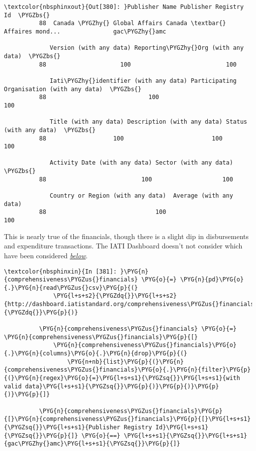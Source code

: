 \documentclass[letterpaper,10pt,english]{sphinxmanual}
\begin{document}
\begin{Verbatim}[commandchars=\\\{\}]
\textcolor{nbsphinxout}{Out[380]: }Publisher Name Publisher Registry Id  \PYGZbs{}
          88  Canada \PYGZhy{} Global Affairs Canada \textbar{} Affaires mond...               gac\PYGZhy{}amc
          
             Version (with any data) Reporting\PYGZhy{}Org (with any data)  \PYGZbs{}
          88                     100                           100
          
             Iati\PYGZhy{}identifier (with any data) Participating Organisation (with any data)  \PYGZbs{}
          88                             100                                        100
          
             Title (with any data) Description (with any data) Status (with any data)  \PYGZbs{}
          88                   100                         100                    100
          
             Activity Date (with any data) Sector (with any data)  \PYGZbs{}
          88                           100                    100
          
             Country or Region (with any data)  Average (with any data)
          88                               100                      100
\end{Verbatim}

This is nearly true of the financials, though there is a slight dip in
disbursements and expenditure transactions. The IATI Dashboard doesn't
not consider  which have been considered
{\hyperref[\detokenize{Global Affairs Canada - Compliance Report:Deliverable-3.1.6}]{\emph{below}}}.

\begin{Verbatim}[commandchars=\\\{\}]
\textcolor{nbsphinxin}{In [381]: }\PYG{n}{comprehensiveness\PYGZus{}financials} \PYG{o}{=} \PYG{n}{pd}\PYG{o}{.}\PYG{n}{read\PYGZus{}csv}\PYG{p}{(}
              \PYG{l+s+s2}{\PYGZdq{}}\PYG{l+s+s2}{http://dashboard.iatistandard.org/comprehensiveness\PYGZus{}financials.csv}\PYG{l+s+s2}{\PYGZdq{}}\PYG{p}{)}
          
          \PYG{n}{comprehensiveness\PYGZus{}financials} \PYG{o}{=} \PYG{n}{comprehensiveness\PYGZus{}financials}\PYG{p}{[}
              \PYG{n}{comprehensiveness\PYGZus{}financials}\PYG{o}{.}\PYG{n}{columns}\PYG{o}{.}\PYG{n}{drop}\PYG{p}{(}
                  \PYG{n+nb}{list}\PYG{p}{(}\PYG{n}{comprehensiveness\PYGZus{}financials}\PYG{o}{.}\PYG{n}{filter}\PYG{p}{(}\PYG{n}{regex}\PYG{o}{=}\PYG{l+s+s1}{\PYGZsq{}}\PYG{l+s+s1}{with valid data}\PYG{l+s+s1}{\PYGZsq{}}\PYG{p}{)}\PYG{p}{)}\PYG{p}{)}\PYG{p}{]}
          
          \PYG{n}{comprehensiveness\PYGZus{}financials}\PYG{p}{[}\PYG{n}{comprehensiveness\PYGZus{}financials}\PYG{p}{[}\PYG{l+s+s1}{\PYGZsq{}}\PYG{l+s+s1}{Publisher Registry Id}\PYG{l+s+s1}{\PYGZsq{}}\PYG{p}{]} \PYG{o}{==} \PYG{l+s+s1}{\PYGZsq{}}\PYG{l+s+s1}{gac\PYGZhy{}amc}\PYG{l+s+s1}{\PYGZsq{}}\PYG{p}{]}
\end{Verbatim}
\end{document}
